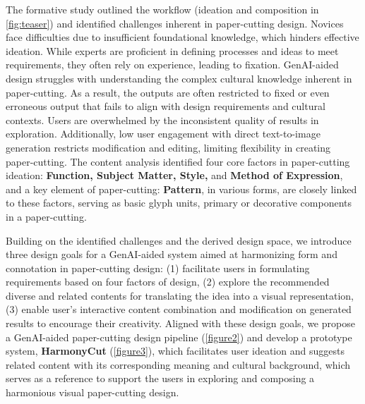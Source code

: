 The formative study outlined the workflow (ideation and composition in \autoref{fig:teaser}) and identified challenges inherent in paper-cutting design. Novices face difficulties due to insufficient foundational knowledge, which hinders effective ideation. While experts are proficient in defining processes and ideas to meet requirements, they often rely on experience, leading to fixation. GenAI-aided design struggles with understanding the complex cultural knowledge inherent in paper-cutting. As a result, the outputs are often restricted to fixed or even erroneous output that fails to align with design requirements and cultural contexts. Users are overwhelmed by the inconsistent quality of results in exploration. Additionally, low user engagement with direct text-to-image generation restricts modification and editing, limiting flexibility in creating paper-cutting. 
The content analysis identified four core factors in paper-cutting ideation: \textbf{Function, Subject Matter, Style,} and \textbf{Method of Expression}, and a key element of paper-cutting: \textbf{Pattern}, in various forms, are closely linked to these factors, serving as basic glyph units, primary or decorative components in a paper-cutting.

Building on the identified challenges and the derived design space, we introduce three design goals for a GenAI-aided system aimed at harmonizing form and connotation in paper-cutting design: (1) facilitate users in formulating requirements based on four factors of design, (2) explore the recommended diverse and related contents for translating the idea into a visual representation, (3) enable user's interactive content combination and modification on generated results to encourage their creativity.
Aligned with these design goals, we propose a GenAI-aided paper-cutting design pipeline (\autoref{figure2}) and develop a prototype system, \textbf{HarmonyCut} (\autoref{figure3}), which facilitates user ideation and suggests related content with its corresponding meaning and cultural background, which serves as a reference to support the users in exploring and composing a harmonious visual paper-cutting design.

